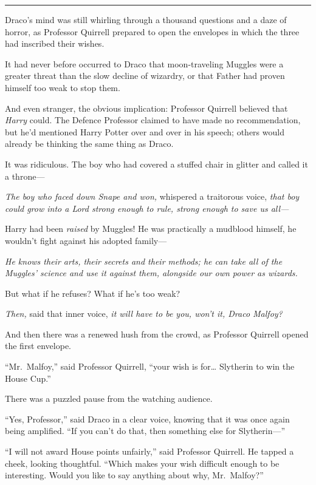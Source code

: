 \begin{center}\rule{3in}{0.4pt}\end{center}

Draco's mind was still whirling through a thousand questions and a daze
of horror, as Professor Quirrell prepared to open the envelopes in which
the three had inscribed their wishes.

It had never before occurred to Draco that moon-traveling Muggles were a
greater threat than the slow decline of wizardry, or that Father had
proven himself too weak to stop them.

And even stranger, the obvious implication: Professor Quirrell believed
that \emph{Harry} could. The Defence Professor claimed to have made no
recommendation, but he'd mentioned Harry Potter over and over in his
speech; others would already be thinking the same thing as Draco.

It was ridiculous. The boy who had covered a stuffed chair in glitter
and called it a throne---

\emph{The boy who faced down Snape and won,} whispered a traitorous
voice, \emph{that boy could grow into a Lord strong enough to rule,
strong enough to save us all---}

Harry had been \emph{raised} by Muggles! He was practically a mudblood
himself, he wouldn't fight against his adopted family---

\emph{He knows their arts, their secrets and their methods; he can take
all of the Muggles' science and use it against them, alongside our own
power as wizards.}

But what if he refuses? What if he's too weak?

\emph{Then,} said that inner voice, \emph{it will have to be you, won't
it, Draco Malfoy?}

And then there was a renewed hush from the crowd, as Professor Quirrell
opened the first envelope.

``Mr.~Malfoy,'' said Professor Quirrell, ``your wish is for\ldots{}
Slytherin to win the House Cup.''

There was a puzzled pause from the watching audience.

``Yes, Professor,'' said Draco in a clear voice, knowing that it was
once again being amplified. ``If you can't do that, then something else
for Slytherin---''

``I will not award House points unfairly,'' said Professor Quirrell. He
tapped a cheek, looking thoughtful. ``Which makes your wish difficult
enough to be interesting. Would you like to say anything about why,
Mr.~Malfoy?''

